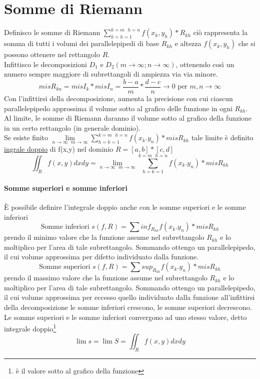 \section{Somme di Riemann}
Definisco le somme di Riemann $\displaystyle\sum^{k=m\text{ } h=n}_{k=h=1}f(x_k,y_h)*R_{kh}$ ciò
rappresenta la somma di tutti i volumi dei parallelepipedi di base $R_{kh}$ e altezza $f(x_k,y_h)$
che si possono ottenere nel rettangolo $R$.\\
Infittisco le decomposizioni $D_1$ e $D_2(m\to \infty;n\to\infty)$, ottenendo così un numero sempre
maggiore di subrettangoli di ampiezza via via minore.
\begin{equation}
  mis R_{kn}=misI_k*misI_n=\frac{b-a}{m} * \frac{d-c}{n}\to 0 \text{ per }  m,n \to \infty
\end{equation}
Con l'infittirsi della decomposizione, aumenta la precisione con cui ciascun parallelepipedo
approssima il volume sotto al grafico delle funzione in ogni $R_{kh}$.\\
Al limite, le somme di Riemann daranno il volume sotto al grafico della funzione in un certo
rettangolo (in generale dominio).\\
Se esiste finito $\lim\limits_{n\to \infty\text{ } m\to \infty}\displaystyle\sum_{h=k=1}^{k=m\text{ }h=n}f(x_k.y_n)*misR_{kh}$ tale limite è definito \underline{\color{red} ingrale doppio} di f(x,y) nel
dominio $R=[a,b]*[c,d]$
\begin{equation}
  \iint_R f(x,y)dxdy=\lim\limits_{n\to \infty\text{ } m\to \infty}\displaystyle\sum_{h=k=1}^{k=m\text{ }h=n}f(x_k.y_n)*misR_{kh}
\end{equation}
\paragraph{Somme superiori e somme inferiori}
\begin{defi}
  È possibile definire l'integrale doppio anche con le somme superiori e le somme inferiori
  \begin{equation*}
    \text{Somme inferiori } s(f,R) = \displaystyle\sum inf_{R_{kh}}f(x_k.y_n)*misR_{kh}
  \end{equation*}
  prendo il minimo valore che la funzione assume nel subrettangolo $R_{kh}$ e lo moltiplico per
  l'area di tale subrettangolo. Sommando ottengo un parallelepipedo, il cui volume approssima
  per difetto individuato dalla funzione. 
  \begin{equation*}
    \text{Somme superiori } s(f,R) = \displaystyle\sum sup_{R_{kh}}f(x_k.y_n)*misR_{kh}
  \end{equation*}
  prendo il massimo valore che la funzione assume nel subrettangolo $R_{kh}$ e lo moltiplico per
  l'area di tale subrettangolo. Sommando ottengo un parallelepipedo, il cui volume approssima per
  eccesso quello individuato dalla funzione all'infittirsi della decomposizione le somme inferiori
  crescono, le somme superiori decrescono. Le somme superiori e le somme inferiori convergono ad
  uno stesso valore, detto {\color{red}integrale doppio}\footnote{è il valore sotto al grafico
    della funzione}
  \begin{equation*}
    \lim s=\lim S=\iint_R f(x,y)dxdy
  \end{equation*}
\end{defi}
\clearpage
